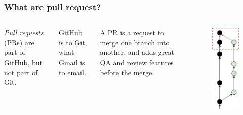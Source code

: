 \documentclass[aspectratio=169]{beamer} %
\begin{document}
\begin{frame}
	\frametitle{What are pull request?}
	\begin{columns}[c]
		
		
		\textit{Pull requests} (PRs) are part of GitHub, but not part of Git.	
		\vspace{2em}
		
		GitHub is to Git, what Gmail is to email.
		\vspace{2em}
		
		A PR is a request to merge one branch into another,
		and adds great QA and review features before the merge.
		
		\begin{minipage}[t][6.5cm][t]{\textwidth}
			\begin{figure}
				\centering
				\includegraphics[width=.55\textwidth]{./img/pr-highlight.png}
			\end{figure}
		\end{minipage}
		

\end{columns}
\end{frame}
\end{document}
